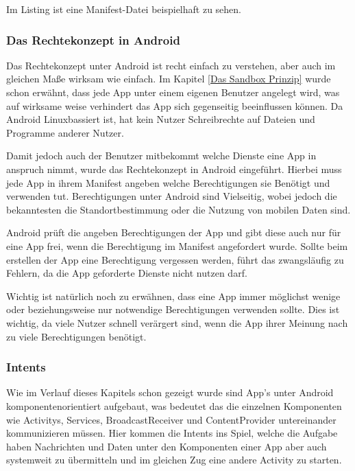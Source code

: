 Im Listing ist eine Manifest-Datei beispielhaft zu sehen.



\subsubsection{Das Rechtekonzept in Android}
Das Rechtekonzept unter Android ist recht einfach zu verstehen, aber auch im gleichen Ma\ss{}e wirksam wie einfach. Im Kapitel \ref{Das Sandbox Prinzip} wurde schon erw\"ahnt, dass jede App unter einem eigenen Benutzer angelegt wird, was auf wirksame weise verhindert das App sich gegenseitig beeinflussen k\"onnen. Da Android Linuxbassiert ist, hat kein Nutzer Schreibrechte auf Dateien und Programme anderer Nutzer.

Damit jedoch auch der Benutzer mitbekommt welche Dienste eine App in anspruch nimmt, wurde das Rechtekonzept in Android eingef\"uhrt. Hierbei muss jede App in ihrem Manifest angeben welche Berechtigungen sie Ben\"otigt und verwenden tut. Berechtigungen unter Android sind Vielseitig, wobei jedoch die bekanntesten die Standortbestimmung oder die Nutzung von mobilen Daten sind. \cite{BerechtigungenPIT}

Android pr\"uft die angeben Berechtigungen der App und gibt diese auch nur f\"ur eine App frei, wenn die Berechtigung im Manifest angefordert wurde. Sollte beim erstellen der App eine Berechtigung vergessen werden, f\"uhrt das zwangsl\"aufig zu Fehlern, da die App geforderte Dienste nicht nutzen darf.

Wichtig ist nat\"urlich noch zu erw\"ahnen, dass eine App immer m\"oglichst wenige oder beziehungsweise nur notwendige Berechtigungen verwenden sollte. Dies ist wichtig, da viele Nutzer schnell ver\"argert sind, wenn die App ihrer Meinung nach zu viele Berechtigungen ben\"otigt. \cite{BerechtigungenPIT}

\subsubsection{Intents} \label{Intents}
Wie im Verlauf dieses Kapitels schon gezeigt wurde sind App's unter Android komponentenorientiert aufgebaut, was bedeutet das die einzelnen Komponenten wie Activitys, Services, BroadcastReceiver und ContentProvider untereinander kommunizieren m\"ussen. Hier kommen die Intents ins Spiel, welche die Aufgabe haben Nachrichten und Daten unter den Komponenten einer App aber auch systemweit zu \"ubermitteln und im gleichen Zug eine andere Activity zu starten.

